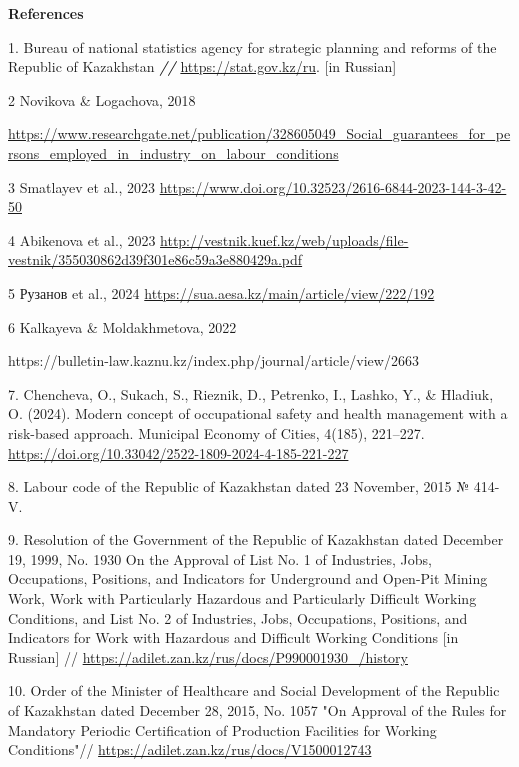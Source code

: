 \begin{center}
{\bfseries References}
\end{center}

\begin{references}
1. Bureau of national statistics agency for strategic planning and
reforms of the Republic of Kazakhstan \emph{{\bfseries //}}
\url{https://stat.gov.kz/ru}. {[}in Russian{]}

2 Novikova \& Logachova, 2018

\url{https://www.researchgate.net/publication/328605049_Social_guarantees_for_persons_employed_in_industry_on_labour_conditions}

3 Smatlayev et al., 2023
\url{https://www.doi.org/10.32523/2616-6844-2023-144-3-42-50}

4 Abikenova et al., 2023
\url{http://vestnik.kuef.kz/web/uploads/file-vestnik/355030862d39f301e86c59a3e880429a.pdf}

5 Рузанов et al., 2024
\url{https://sua.aesa.kz/main/article/view/222/192}

6 Kalkayeva \& Moldakhmetova, 2022

https://bulletin-law.kaznu.kz/index.php/journal/article/view/2663

7. Chencheva, O., Sukach, S., Rieznik, D., Petrenko, I., Lashko, Y., \&
Hladiuk, O. (2024). Modern concept of occupational safety and health
management with a risk-based approach. Municipal Economy of Cities,
4(185), 221--227.
\url{https://doi.org/10.33042/2522-1809-2024-4-185-221-227}

8. Labour code of the Republic of Kazakhstan dated 23 November, 2015 №
414-V.

9. Resolution of the Government of the Republic of Kazakhstan dated
December 19, 1999, No. 1930 On the Approval of List No. 1 of Industries,
Jobs, Occupations, Positions, and Indicators for Underground and
Open-Pit Mining Work, Work with Particularly Hazardous and Particularly
Difficult Working Conditions, and List No. 2 of Industries, Jobs,
Occupations, Positions, and Indicators for Work with Hazardous and
Difficult Working Conditions {[}in Russian{]} //
\url{https://adilet.zan.kz/rus/docs/P990001930_/history}

10. Order of the Minister of Healthcare and Social Development of the
Republic of Kazakhstan dated December 28, 2015, No. 1057 "On Approval of
the Rules for Mandatory Periodic Certification of Production Facilities
for Working Conditions"//
\url{https://adilet.zan.kz/rus/docs/V1500012743}


\end{references}
